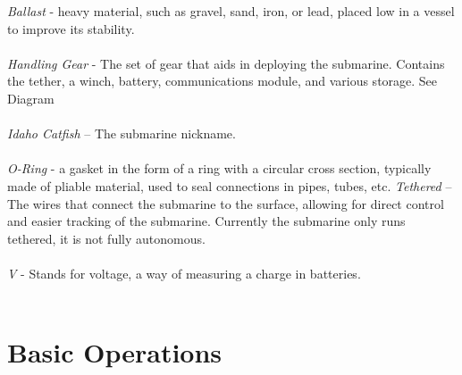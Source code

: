 \documentclass[
10pt, %
a4paper, %
oneside, %
headinclude,footinclude, %
BCOR5mm, %
]{scrartcl}
\begin{document}
\textit{Ballast} - heavy material, such as gravel, sand, iron, or lead, placed low in a vessel to improve its stability. \\ \\
\textit{Handling Gear} - The set of gear that aids in deploying the submarine. Contains the tether, a winch, battery, communications module, and various storage. See Diagram \\ \\
\textit{Idaho Catfish }  – The submarine nickname. \\ \\
\textit{O-Ring} - a gasket in the form of a ring with a circular cross section, typically made of pliable material, used to seal connections in pipes, tubes, etc.
\textit{Tethered } – The wires that connect the submarine to the surface, allowing for direct control and easier tracking of the submarine. Currently the submarine only runs tethered, it is not fully autonomous. \\ \\
\textit{ V } - Stands for voltage, a way of measuring a charge in batteries. \\ \\

\newpage
 

\section{Basic Operations}
\end{document}
